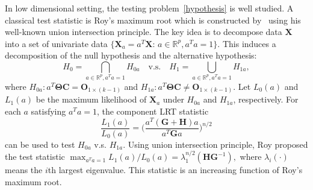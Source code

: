 \documentclass[12pt]{article} %
\newcommand{\bX}{\mathbf{X}}
\newcommand{\bH}{\mathbf{H}}
\newcommand{\bG}{\mathbf{G}}
\newcommand{\bC}{\mathbf{C}}
\newcommand{\bO}{\mathbf{O}}
\newcommand{\bfsym}[1]{\ensuremath{\boldsymbol{#1}}}
\def\bTheta {\bfsym {\Theta}}
\theoremstyle{definition}
\begin{document}
In low dimensional setting, the testing problem~\eqref{hypothesis} is well studied.
A classical test statistic is Roy's maximum root which is constructed by~\cite{Roy1953} using his well-known union intersection principle.
        The key idea is to decompose data $\bX$ into a set of univariate data $\{\bX_{a}=a^T \bX:\, a\in \mathbb{R}^p, a^T a=1\}$.
        This induces a decomposition of the null hypothesis and the alternative hypothesis:
        $$
        H_0=\bigcap_{a\in\mathbb{R}^p, a^T a=1} H_{0a} \quad \text{v.s.} \quad 
        H_1=\bigcup_{a\in\mathbb{R}^p, a^T a=1} H_{1a},
        $$
        where 
 $H_{0a}: a^T \bTheta \bC = \bO_{1\times (k-1)}$ and  $H_{1a} : a^T \bTheta \bC \neq \bO_{1\times (k-1)}$.
Let $L_0(a)$ and $L_1(a)$ be the maximum likelihood of $\bX_a$ under $H_{0a}$ and $H_{1a}$, respectively.
For each $a$ satisfying $a^T a=1$, the component LRT statistic
$$ \frac{L_1(a)}{L_0(a)}=\Big(\frac{a^T(\bG+\bH) a}{a^T \bG a}\Big)^{n/2}$$
can be used to test $H_{0a}$ v.s. $H_{1a}$. 
Using union intersection principle, Roy proposed the test statistic
$
\max_{a^T a=1}  {L_1(a)}/{L_0(a)}=\lambda_{1}^{n/2}(\bH\bG^{-1}),
$
where $\lambda_{i}(\cdot)$ means the $i$th largest eigenvalue.
This statistic is an increasing function of Roy's maximum root.
\end{document}
